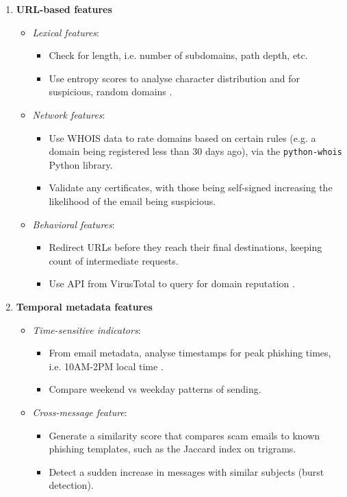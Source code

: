 \begin{enumerate}
\begin{itemize}
\begin{itemize}
    \end{itemize}
  \end{itemize}
  \item \textbf{URL-based features}
  \begin{itemize}
    \item \textit{Lexical features}:
    \begin{itemize}
      \item Check for length, i.e. number of subdomains, path depth, etc.
      \item Use entropy scores to analyse character distribution and for suspicious, random domains \citep{palaniappan2020malicious}.
    \end{itemize}
    \item \textit{Network features}:
    \begin{itemize}
      \item Use WHOIS data to rate domains based on certain rules (e.g. a domain being registered less than 30 days ago), via the \texttt{python-whois} Python library.
      \item Validate any certificates, with those being self-signed increasing the likelihood of the email being suspicious.
    \end{itemize}
    \item \textit{Behavioral features}:
    \begin{itemize}
      \item Redirect URLs before they reach their final destinations, keeping count of intermediate requests.
      \item Use API from VirusTotal to query for domain reputation \citep{lin2021phishpedia}.
    \end{itemize}
  \end{itemize}
  \item \textbf{Temporal metadata features}
  \begin{itemize}
    \item \textit{Time-sensitive indicators}:
    \begin{itemize}
      \item From email metadata, analyse timestamps for peak phishing times, i.e. 10AM-2PM local time \citep{vishwanath2011people}.
      \item Compare weekend vs weekday patterns of sending.
    \end{itemize}
    \item \textit{Cross-message feature}:
    \begin{itemize}
      \item Generate a similarity score that compares scam emails to known phishing templates, such as the Jaccard index on trigrams.
      \item Detect a sudden increase in messages with similar subjects (burst detection).
    \end{itemize}
  \end{itemize}
\end{enumerate}

